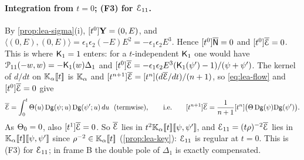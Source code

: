 \paragraph{Integration from $t = 0$; (F3) for $\mathcal{E}_{11}$.}
By \cref{prop:lea-sigma}(i), $[t^0]\mathbf{Y} = (0,E)$, and $\langle(0,E),(0,E)\rangle = \epsilon_1\epsilon_2(-E)E^2 = -\epsilon_1\epsilon_2E^3$. Hence $[t^0]\overline{\mathsf{N}} = 0$ and $[t^0]\overline{\mathcal{E}} = 0$. This is where $\mathsf{K}_{1} = 1$ enters: for a $t$-independent $\mathsf{K}_{1}$ one would have $\mathcal{P}_{11}(-w,w) = -\mathsf{K}_{1}(w)\Delta_1$ and $[t^0]\overline{\mathcal{E}} = -\epsilon_1\epsilon_2E^3(\mathsf{K}_{1}(\psi')-1)/(\psi+\psi')$. The kernel of $d/dt$ on $\mathbb{K}_{\alpha}[\![ t ]\!]$ is $\mathbb{K}_{\alpha}$ and $[t^{n+1}]\overline{\mathcal{E}} = [t^n](d\overline{\mathcal{E}}/dt)/(n+1)$, so \eqref{eq:lea-flow} and $[t^0]\overline{\mathcal{E}} = 0$ give
\begin{equation}
\label{eq:lea-int}
\Ebar = \int_0^t\Thf(u)\,\Dg(\psi;u)\,\Dg(\psi';u)\,du\ \ \text{(termwise)},\qquad\text{i.e.}\qquad \coef{t^{n+1}}\Ebar = \frac{1}{n+1}\coef{t^n}\bigl(\Thf\,\Dg(\psi)\Dg(\psi')\bigr).
\end{equation}
As $\Theta_0 = 0$, also $[t^1]\overline{\mathcal{E}} = 0$. So $\overline{\mathcal{E}}$ lies in $t^2\mathbb{K}_{\alpha}[\![ t ]\!][\![ \psi,\psi' ]\!]$, and $\mathcal{E}_{11} = (t\rho)^{-2}\overline{\mathcal{E}}$ lies in $\mathbb{K}_{\alpha}[\![ t ]\!][\![ \psi,\psi' ]\!]$ since $\rho^{-2}\in\mathbb{K}_{\alpha}[\![ t ]\!]$ (\cref{prop:lea-key}): $\mathcal{E}_{11}$ is regular at $t = 0$. This is (F3) for $\mathcal{E}_{11}$; in frame B the double pole of $\Delta_1$ is exactly compensated.

